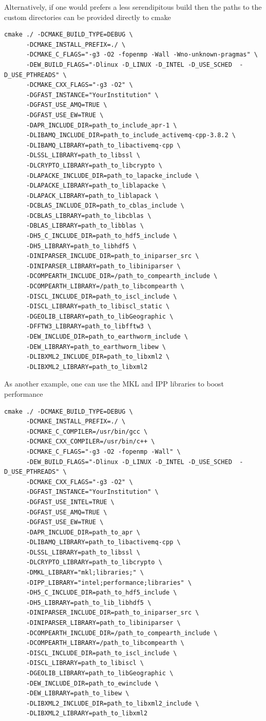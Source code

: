\documentclass[12pt]{article}
\begin{document}
Alternatively, if one would prefers a less serendipitous build then the paths to the custom
directories can be provided directly to cmake  
\begin{verbatim}
cmake ./ -DCMAKE_BUILD_TYPE=DEBUG \
      -DCMAKE_INSTALL_PREFIX=./ \
      -DCMAKE_C_FLAGS="-g3 -O2 -fopenmp -Wall -Wno-unknown-pragmas" \
      -DEW_BUILD_FLAGS="-Dlinux -D_LINUX -D_INTEL -D_USE_SCHED  -D_USE_PTHREADS" \
      -DCMAKE_CXX_FLAGS="-g3 -O2" \
      -DGFAST_INSTANCE="YourInstitution" \
      -DGFAST_USE_AMQ=TRUE \
      -DGFAST_USE_EW=TRUE \      
      -DAPR_INCLUDE_DIR=path_to_include_apr-1 \
      -DLIBAMQ_INCLUDE_DIR=path_to_include_activemq-cpp-3.8.2 \
      -DLIBAMQ_LIBRARY=path_to_libactivemq-cpp \
      -DLSSL_LIBRARY=path_to_libssl \
      -DLCRYPTO_LIBRARY=path_to_libcrypto \
      -DLAPACKE_INCLUDE_DIR=path_to_lapacke_include \
      -DLAPACKE_LIBRARY=path_to_liblapacke \
      -DLAPACK_LIBRARY=path_to_liblapack \
      -DCBLAS_INCLUDE_DIR=path_to_cblas_include \
      -DCBLAS_LIBRARY=path_to_libcblas \
      -DBLAS_LIBRARY=path_to_libblas \
      -DH5_C_INCLUDE_DIR=path_to_hdf5_include \
      -DH5_LIBRARY=path_to_libhdf5 \
      -DINIPARSER_INCLUDE_DIR=path_to_iniparser_src \
      -DINIPARSER_LIBRARY=path_to_libiniparser \
      -DCOMPEARTH_INCLUDE_DIR=/path_to_compearth_include \
      -DCOMPEARTH_LIBRARY=/path_to_libcompearth \
      -DISCL_INCLUDE_DIR=path_to_iscl_include \
      -DISCL_LIBRARY=path_to_libiscl_static \
      -DGEOLIB_LIBRARY=path_to_libGeographic \
      -DFFTW3_LIBRARY=path_to_libfftw3 \
      -DEW_INCLUDE_DIR=path_to_earthworm_include \
      -DEW_LIBRARY=path_to_earthworm_libew \
      -DLIBXML2_INCLUDE_DIR=path_to_libxml2 \
      -DLIBXML2_LIBRARY=path_to_libxml2
\end{verbatim}
As another example, one can use the MKL and IPP libraries to boost performance 
\begin{verbatim}
cmake ./ -DCMAKE_BUILD_TYPE=DEBUG \
      -DCMAKE_INSTALL_PREFIX=./ \
      -DCMAKE_C_COMPILER=/usr/bin/gcc \
      -DCMAKE_CXX_COMPILER=/usr/bin/c++ \
      -DCMAKE_C_FLAGS="-g3 -O2 -fopenmp -Wall" \
      -DEW_BUILD_FLAGS="-Dlinux -D_LINUX -D_INTEL -D_USE_SCHED  -D_USE_PTHREADS" \
      -DCMAKE_CXX_FLAGS="-g3 -O2" \
      -DGFAST_INSTANCE="YourInstitution" \
      -DGFAST_USE_INTEL=TRUE \
      -DGFAST_USE_AMQ=TRUE \
      -DGFAST_USE_EW=TRUE \      
      -DAPR_INCLUDE_DIR=path_to_apr \
      -DLIBAMQ_LIBRARY=path_to_libactivemq-cpp \
      -DLSSL_LIBRARY=path_to_libssl \
      -DLCRYPTO_LIBRARY=path_to_libcrypto \
      -DMKL_LIBRARY="mkl;libraries;" \
      -DIPP_LIBRARY="intel;performance;libraries" \
      -DH5_C_INCLUDE_DIR=path_to_hdf5_include \
      -DH5_LIBRARY=path_to_lib_libhdf5 \
      -DINIPARSER_INCLUDE_DIR=path_to_iniparser_src \
      -DINIPARSER_LIBRARY=path_to_libiniparser \
      -DCOMPEARTH_INCLUDE_DIR=/path_to_compearth_include \
      -DCOMPEARTH_LIBRARY=/path_to_libcompearth \
      -DISCL_INCLUDE_DIR=path_to_iscl_include \
      -DISCL_LIBRARY=path_to_libiscl \
      -DGEOLIB_LIBRARY=path_to_libGeographic \
      -DEW_INCLUDE_DIR=path_to_ewinclude \
      -DEW_LIBRARY=path_to_libew \
      -DLIBXML2_INCLUDE_DIR=path_to_libxml2_include \
      -DLIBXML2_LIBRARY=path_to_libxml2
\end{verbatim}
\end{document}
